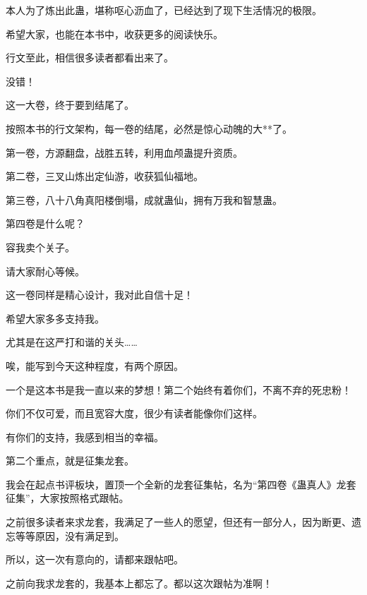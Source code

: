 \begin{this_body}
本人为了炼出此蛊，堪称呕心沥血了，已经达到了现下生活情况的极限。

希望大家，也能在本书中，收获更多的阅读快乐。

行文至此，相信很多读者都看出来了。

没错！

这一大卷，终于要到结尾了。

按照本书的行文架构，每一卷的结尾，必然是惊心动魄的大**了。

第一卷，方源翻盘，战胜五转，利用血颅蛊提升资质。

第二卷，三叉山炼出定仙游，收获狐仙福地。

第三卷，八十八角真阳楼倒塌，成就蛊仙，拥有万我和智慧蛊。

第四卷是什么呢？

容我卖个关子。

请大家耐心等候。

这一卷同样是精心设计，我对此自信十足！

希望大家多多支持我。

尤其是在这严打和谐的关头……

唉，能写到今天这种程度，有两个原因。

一个是这本书是我一直以来的梦想！第二个始终有着你们，不离不弃的死忠粉！

你们不仅可爱，而且宽容大度，很少有读者能像你们这样。

有你们的支持，我感到相当的幸福。

第二个重点，就是征集龙套。

我会在起点书评板块，置顶一个全新的龙套征集帖，名为“第四卷《蛊真人》龙套征集”，大家按照格式跟帖。

之前很多读者来求龙套，我满足了一些人的愿望，但还有一部分人，因为断更、遗忘等等原因，没有满足到。

所以，这一次有意向的，请都来跟帖吧。

之前向我求龙套的，我基本上都忘了。都以这次跟帖为准啊！

\end{this_body}

